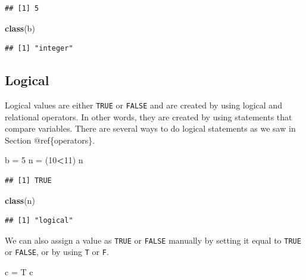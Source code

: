 \documentclass[
]{book}
\newenvironment{Shaded}{\begin{snugshade}}{\end{snugshade}}
\newcommand{\DecValTok}[1]{\textcolor[rgb]{0.00,0.00,0.81}{#1}}
\newcommand{\KeywordTok}[1]{\textcolor[rgb]{0.13,0.29,0.53}{\textbf{#1}}}
\newcommand{\NormalTok}[1]{#1}
\newcommand{\OperatorTok}[1]{\textcolor[rgb]{0.81,0.36,0.00}{\textbf{#1}}}
\newcommand{\StringTok}[1]{\textcolor[rgb]{0.31,0.60,0.02}{#1}}
\begin{document}
\begin{verbatim}
## [1] 5
\end{verbatim}

\begin{Shaded}
\begin{Highlighting}[]
\KeywordTok{class}\NormalTok{(b)}
\end{Highlighting}
\end{Shaded}

\begin{verbatim}
## [1] "integer"
\end{verbatim}

\hypertarget{logical}{%
\subsection*{Logical}\label{logical}}

Logical values are either \texttt{TRUE} or \texttt{FALSE} and are created by using logical and relational operators. In other words, they are created by using statements that compare variables. There are several ways to do logical statements as we saw in Section @ref\{operators\}.

\begin{Shaded}
\begin{Highlighting}[]
\NormalTok{b =}\StringTok{ }\DecValTok{5}
\NormalTok{n =}\StringTok{ }\NormalTok{(}\DecValTok{10}\OperatorTok{<}\DecValTok{11}\NormalTok{)}
\NormalTok{n}
\end{Highlighting}
\end{Shaded}

\begin{verbatim}
## [1] TRUE
\end{verbatim}

\begin{Shaded}
\begin{Highlighting}[]
\KeywordTok{class}\NormalTok{(n)}
\end{Highlighting}
\end{Shaded}

\begin{verbatim}
## [1] "logical"
\end{verbatim}

We can also assign a value as \texttt{TRUE} or \texttt{FALSE} manually by setting it equal to \texttt{TRUE} or \texttt{FALSE}, or by using \texttt{T} or \texttt{F}.

\begin{Shaded}
\begin{Highlighting}[]
\NormalTok{c =}\StringTok{ }\NormalTok{T}
\NormalTok{c}
\end{Highlighting}
\end{Shaded}
\end{document}

